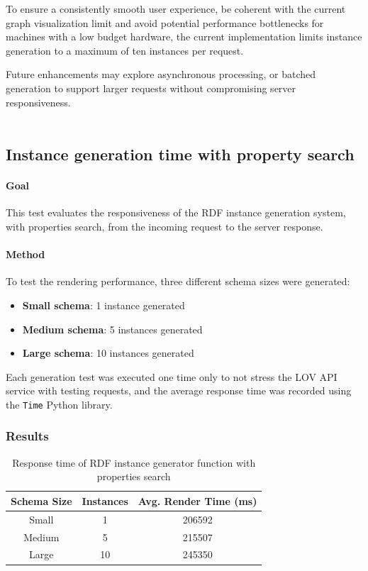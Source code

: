 To ensure a consistently smooth user experience, be coherent with the current graph visualization limit and avoid potential performance bottlenecks for machines with a low budget hardware, the current implementation limits instance generation to a maximum of ten instances per request. 

Future enhancements may explore asynchronous processing, or batched generation to support larger requests without compromising server responsiveness.
\\
\\
\subsection{Instance generation time with property search}

\paragraph{Goal}
This test evaluates the responsiveness of the RDF instance generation system, with properties search, from the incoming request to the server response.

\paragraph{Method}
To test the rendering performance, three different schema sizes were generated:
\begin{itemize}
    \item \textbf{Small schema}: 1 instance generated
    \item \textbf{Medium schema}: 5 instances generated
    \item \textbf{Large schema}: 10 instances generated
\end{itemize}

Each generation test was executed one time only to not stress the LOV API service with testing requests, and the average response time was recorded using the \texttt{Time} Python library.

\subsubsection{Results}

\begin{table}[H]
\centering
\begin{tabular}{|c|c|c|}
\hline
\textbf{Schema Size} & \textbf{Instances} & \textbf{Avg. Render Time (ms)} \\ \hline
Small & 1 & 206592 \\ \hline
Medium & 5 & 215507\\ \hline
Large & 10 & 245350 \\ \hline
\end{tabular}
\caption{Response time of RDF instance generator function with properties search}
\label{tab:rendering-times}
\end{table}

